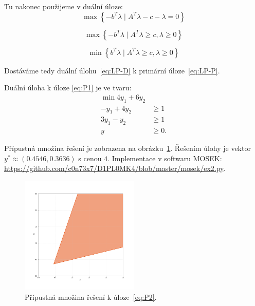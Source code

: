 \noindent Tu nakonec použijeme v duální úloze:
\begin{equation*}
    \max \left\{ -b^T\lambda \mid A^T\lambda -c - \lambda = 0 \right\}
\end{equation*}

\begin{equation*}
    \max \left\{ -b^T\lambda \mid A^T\lambda \geq c, \lambda \geq 0 \right\}
\end{equation*}

\begin{equation}\tag{LP-D}
    \min \left\{ b^T\lambda \mid A^T\lambda \geq c, \lambda \geq 0 \right\}
    \label{eq:LP-D}
\end{equation}

\noindent Dostáváme tedy duální úlohu~\ref{eq:LP-D} k primární úloze~\ref{eq:LP-P}.

\begin{pr}
Duální úloha k úloze \ref{eq:P1} je ve tvaru:
\begin{equation}\tag{P2}
    \begin{split}
        \min 4 y_1 + 6 y_2 &       \\
        - y_1 + 4 y_2      &\geq 1 \\
        3 y_1 -   y_2      &\geq 1 \\
        y &\geq 0.
    \end{split}
    \label{eq:P2}
\end{equation}

Přípustná množina řešení je zobrazena na obrázku~\ref{fig:ex2}. Řešením úlohy je vektor $y^* \approx (0.4546, 0.3636)$ s cenou $4$. Implementace v softwaru MOSEK: \url{https://github.com/c0n73x7/D1PL0MK4/blob/master/mosek/ex2.py}.
\end{pr}

\begin{figure}[h!]
    \centering
    \includegraphics[width=0.5\textwidth]{img/ex2.png}   
    \caption{Přípustná množina řešení k úloze~\ref{eq:P2}.}
    \label{fig:ex2}
\end{figure}

